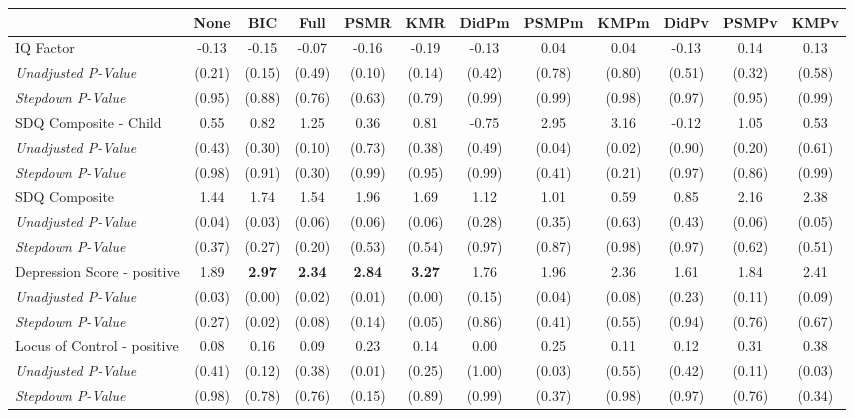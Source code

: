 \begin{tabular}{l c c c c c c c c c c c}
\toprule
 & None & BIC & Full & PSMR & KMR & DidPm & PSMPm & KMPm & DidPv & PSMPv & KMPv \\
\midrule
IQ Factor & -0.13 & -0.15 & -0.07 & -0.16 & -0.19 & -0.13 & 0.04 & 0.04 & -0.13 & 0.14 & 0.13 \\
\quad \textit{Unadjusted P-Value} & (0.21) & (0.15) & (0.49) & (0.10) & (0.14) & (0.42) & (0.78) & (0.80) & (0.51) & (0.32) & (0.58) \\
\quad \textit{Stepdown P-Value} & (0.95) & (0.88) & (0.76) & (0.63) & (0.79) & (0.99) & (0.99) & (0.98) & (0.97) & (0.95) & (0.99) \\
SDQ Composite - Child & 0.55 & 0.82 & 1.25 & 0.36 & 0.81 & -0.75 & 2.95 & 3.16 & -0.12 & 1.05 & 0.53 \\
\quad \textit{Unadjusted P-Value} & (0.43) & (0.30) & (0.10) & (0.73) & (0.38) & (0.49) & (0.04) & (0.02) & (0.90) & (0.20) & (0.61) \\
\quad \textit{Stepdown P-Value} & (0.98) & (0.91) & (0.30) & (0.99) & (0.95) & (0.99) & (0.41) & (0.21) & (0.97) & (0.86) & (0.99) \\
SDQ Composite & 1.44 & 1.74 & 1.54 & 1.96 & 1.69 & 1.12 & 1.01 & 0.59 & 0.85 & 2.16 & 2.38 \\
\quad \textit{Unadjusted P-Value} & (0.04) & (0.03) & (0.06) & (0.06) & (0.06) & (0.28) & (0.35) & (0.63) & (0.43) & (0.06) & (0.05) \\
\quad \textit{Stepdown P-Value} & (0.37) & (0.27) & (0.20) & (0.53) & (0.54) & (0.97) & (0.87) & (0.98) & (0.97) & (0.62) & (0.51) \\
Depression Score - positive & 1.89 & \textbf{ 2.97 } & \textbf{ 2.34 } & \textbf{ 2.84 } & \textbf{ 3.27 } & 1.76 & 1.96 & 2.36 & 1.61 & 1.84 & 2.41 \\
\quad \textit{Unadjusted P-Value} & (0.03) & (0.00) & (0.02) & (0.01) & (0.00) & (0.15) & (0.04) & (0.08) & (0.23) & (0.11) & (0.09) \\
\quad \textit{Stepdown P-Value} & (0.27) & (0.02) & (0.08) & (0.14) & (0.05) & (0.86) & (0.41) & (0.55) & (0.94) & (0.76) & (0.67) \\
Locus of Control - positive & 0.08 & 0.16 & 0.09 & 0.23 & 0.14 & 0.00 & 0.25 & 0.11 & 0.12 & 0.31 & 0.38 \\
\quad \textit{Unadjusted P-Value} & (0.41) & (0.12) & (0.38) & (0.01) & (0.25) & (1.00) & (0.03) & (0.55) & (0.42) & (0.11) & (0.03) \\
\quad \textit{Stepdown P-Value} & (0.98) & (0.78) & (0.76) & (0.15) & (0.89) & (0.99) & (0.37) & (0.98) & (0.97) & (0.76) & (0.34) \\

\end{tabular}
